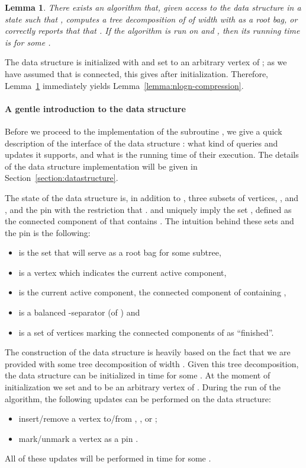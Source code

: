 \documentclass[a4paper,11pt]{article}
\newtheorem{lemma}{Lemma}[section]
\theoremstyle{definition}
\theoremstyle{remark}
\begin{document}
\begin{lemma}
  \label{lemma:nlogn-s-root-bag}
  There exists an algorithm that, given access to the data structure
   in a state such that , computes a tree
  decomposition  of  of width  with 
  as a root bag, or correctly reports that that .  If the algorithm is run on  and , then its
  running time is  for some .
\end{lemma}

The data structure is initialized with  and  set to an
arbitrary vertex of ; as we have assumed that
 is connected, this gives  after
initialization.  Therefore, Lemma~\ref{lemma:nlogn-s-root-bag}
immediately yields Lemma~\ref{lemma:nlogn-compression}.

\paragraph{A gentle introduction to the data structure}
Before we proceed to the implementation of the subroutine ,
we give a quick description of the interface of the data structure
: what kind of queries and updates it supports, and what is the
running time of their execution.  The details of the data structure
implementation will be given in Section~\ref{section:datastructure}.

The state of the data structure is, in addition to , three
subsets of vertices, ,  and , and the pin  with the
restriction that .   and  uniquely imply the
set , defined as the connected component of  that
contains .  The intuition behind these sets and the pin is the
following:

\begin{itemize}
\item  is the set that will serve as a root bag for some subtree,
\item  is a vertex which indicates the current active component,
\item  is the current active component, the connected component of
   containing ,
\item  is a balanced -separator (of ) and
\item  is a set of vertices marking the connected components of
   as ``finished''.
\end{itemize}

The construction of the data structure  is heavily based on the
fact that we are provided with some tree decomposition of width
.  Given this tree decomposition, the data structure can be
initialized in  time for some .  At
the moment of initialization we set  and  to be
an arbitrary vertex of .  During the run of the algorithm, the
following updates can be performed on the data structure:
\begin{itemize}
\item insert/remove a vertex to/from , , or ;
\item mark/unmark a vertex as a pin .
\end{itemize}
All of these updates will be performed in  time
for some .
\end{document}
